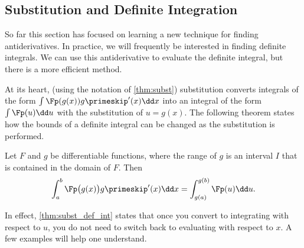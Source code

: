 \subsection{Substitution and Definite Integration}

So far this section has focused on learning a new technique for finding antiderivatives. In practice, we will frequently be interested in finding definite integrals. We can use this antiderivative to evaluate the definite integral, but there is a more efficient method.

At its heart, (using the notation of \autoref{thm:subst}) substitution converts integrals of the form $\int \Fp(g(x))g\primeskip'(x)\dd x$ into an integral of the form $\int \Fp(u)\dd u$ with the substitution of $u = g(x)$. The following theorem states how the bounds of a definite integral can be changed as the substitution is performed.

\begin{theorem}\label{thm:subst_def_int}
Let $F$ and $g$ be differentiable functions, where the range of $g$ is an interval $I$ that is contained in the domain of $F$. Then 
\[\int_a^b \Fp\bigl(g(x)\bigr)g\primeskip'(x)\dd x = \int_{g(a)}^{g(b)} \Fp(u)\dd u.\]
\end{theorem}

In effect, \autoref{thm:subst_def_int} states that once you convert to integrating with respect to $u$, you do not need to switch back to evaluating with respect to $x$. A few examples will help one understand.

